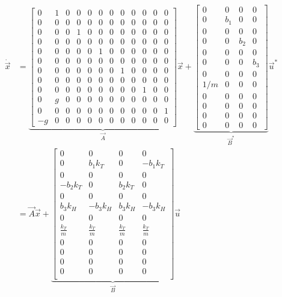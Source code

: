 \begin{equation} \label{eq:linearss}
\begin{split}
	\dot{\vec{x}} &=
	\underbrace{
	\begin{bmatrix}
		0 & 1 & 0 & 0 & 0 & 0 & 0 & 0 & 0 & 0 & 0 & 0 \\
		0 & 0 & 0 & 0 & 0 & 0 & 0 & 0 & 0 & 0 & 0 & 0 \\
		0 & 0 & 0 & 1 & 0 & 0 & 0 & 0 & 0 & 0 & 0 & 0 \\
		0 & 0 & 0 & 0 & 0 & 0 & 0 & 0 & 0 & 0 & 0 & 0 \\
		0 & 0 & 0 & 0 & 0 & 1 & 0 & 0 & 0 & 0 & 0 & 0 \\
		0 & 0 & 0 & 0 & 0 & 0 & 0 & 0 & 0 & 0 & 0 & 0 \\
		0 & 0 & 0 & 0 & 0 & 0 & 0 & 1 & 0 & 0 & 0 & 0 \\
		0 & 0 & 0 & 0 & 0 & 0 & 0 & 0 & 0 & 0 & 0 & 0 \\
		0 & 0 & 0 & 0 & 0 & 0 & 0 & 0 & 0 & 1 & 0 & 0 \\
		0 & g & 0 & 0 & 0 & 0 & 0 & 0 & 0 & 0 & 0 & 0 \\
		0 & 0 & 0 & 0 & 0 & 0 & 0 & 0 & 0 & 0 & 0 & 1 \\
		-g & 0 & 0 & 0 & 0 & 0 & 0 & 0 & 0 & 0 & 0 & 0
	\end{bmatrix}
	}_{\vec{A}}
	\vec{x}
	+
	\underbrace{
	\begin{bmatrix}
		0 & 0 & 0 & 0 \\
		0 & b_1 & 0 & 0 \\
		0 & 0 & 0 & 0 \\
		0 & 0 & b_2 & 0 \\
		0 & 0 & 0 & 0 \\
		0 & 0 & 0 & b_3 \\
		0 & 0 & 0 & 0 \\
		1/m & 0 & 0 & 0 \\
		0 & 0 & 0 & 0 \\
		0 & 0 & 0 & 0 \\
		0 & 0 & 0 & 0 \\
		0 & 0 & 0 & 0
	\end{bmatrix}
	}_{\vec{B}^*}
	\vec{u}^* \\
	&= \vec{A} \vec{x}
	+
	\underbrace{
	\begin{bmatrix}
		0 & 0 & 0 & 0 \\
		0 & b_1 k_T & 0 & -b_1 k_T \\
		0 & 0 & 0 & 0 \\
		-b_2 k_T & 0 & b_2 k_T & 0 \\
		0 & 0 & 0 & 0 \\
		b_3 k_H & -b_3 k_H & b_3 k_H & -b_3 k_H \\
		0 & 0 & 0 & 0 \\
		\frac{k_T}{m} & \frac{k_T}{m} & \frac{k_T}{m} & \frac{k_T}{m} \\
		0 & 0 & 0 & 0 \\
		0 & 0 & 0 & 0 \\
		0 & 0 & 0 & 0 \\
		0 & 0 & 0 & 0 \\
	\end{bmatrix}
	}_{\vec{B}}
	\vec{u}
\end{split}
\end{equation}

